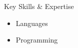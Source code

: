 \begin{frame}{Key Skills \& Expertise}
%
  \begin{itemize}\itemfill
    \item Languages
    \item Programming
  \end{itemize}
%
\end{frame}
